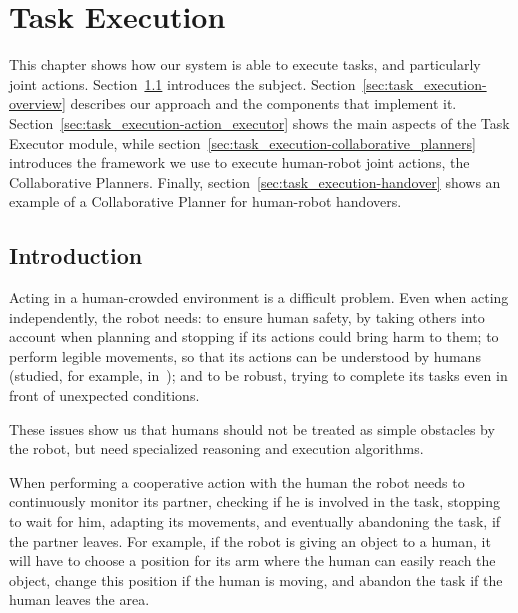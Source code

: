 
\chapter{Task Execution} %

\label{chapter:task_execution} %


This chapter shows how our system is able to execute tasks, and particularly joint actions. Section~\ref{sec:task_execution-intro} introduces the subject. Section~\ref{sec:task_execution-overview} describes our approach and the components that implement it. Section~\ref{sec:task_execution-action_executor} shows the main aspects of the Task Executor module, while section~\ref{sec:task_execution-collaborative_planners} introduces the framework we use to execute human-robot joint actions, the Collaborative Planners. Finally, section~\ref{sec:task_execution-handover} shows an example of a Collaborative Planner for human-robot handovers.


\section{Introduction}
\label{sec:task_execution-intro}
Acting in a human-crowded environment is a difficult problem. Even when acting independently, the robot needs: to ensure human safety, by taking others into account when planning and stopping if its actions could bring harm to them; to perform legible movements, so that its actions can be understood by humans (studied, for example, in~\cite{dragan2013legibility}); and to be robust, trying to complete its tasks even in front of unexpected conditions. 

These issues show us that humans should not be treated as simple obstacles by the robot, but need specialized reasoning and execution algorithms.

When performing a cooperative action with the human the robot needs to continuously monitor its partner, checking if he is involved in the task, stopping to wait for him, adapting its movements, and eventually abandoning the task, if the partner leaves. For example, if the robot is giving an object to a human, it will have to choose a position for its arm where the human can easily reach the object, change this position if the human is moving, and abandon the task if the human leaves the area.

